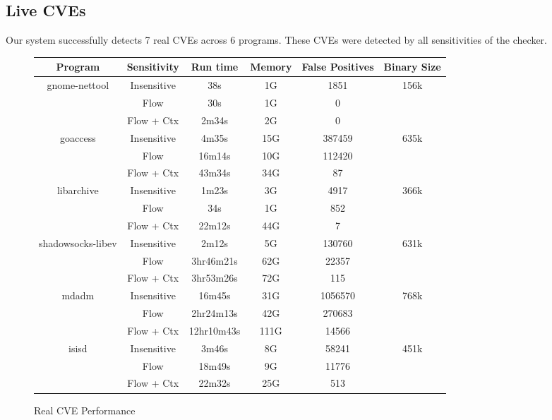 \subsection{Live CVEs}
Our system successfully detects 7 real CVEs across 6 programs.
These CVEs were detected by all sensitivities of the checker.

\begin{figure*}
\begin{center}
\begin{tabular}{|c|c||c|c|c|c|}
\hline
Program & Sensitivity & Run time & Memory & False Positives & Binary Size\\
\hline \hline
\multirow{3}{*}{gnome-nettool} & Insensitive & 38s & 1G & 1851 & \multirow{3}{*}{156k}\\
	& Flow & 30s & 1G & 0 &\\
	& Flow + Ctx & 2m34s & 2G & 0 &\\
	\hline
\multirow{3}{*}{goaccess} & Insensitive & 4m35s & 15G & 387459 & \multirow{3}{*}{635k}\\
	& Flow & 16m14s & 10G & 112420 &\\
	& Flow + Ctx & 43m34s & 34G & 87 &\\
	\hline
\multirow{3}{*}{libarchive} & Insensitive & 1m23s & 3G & 4917 & \multirow{3}{*}{366k}\\
	& Flow & 34s & 1G & 852 &\\
	& Flow + Ctx & 22m12s & 44G & 7 &\\
	\hline
\multirow{3}{*}{shadowsocks-libev} & Insensitive & 2m12s & 5G & 130760 & \multirow{3}{*}{631k}\\
	& Flow & 3hr46m21s & 62G & 22357 &\\
	& Flow + Ctx & 3hr53m26s & 72G & 115 &\\
	\hline
\multirow{3}{*}{mdadm} & Insensitive & 16m45s & 31G & 1056570 & \multirow{3}{*}{768k}\\
	& Flow & 2hr24m13s & 42G & 270683 &\\
	& Flow + Ctx & 12hr10m43s & 111G & 14566 &\\
	\hline
\multirow{3}{*}{isisd} & Insensitive & 3m46s & 8G & 58241 & \multirow{3}{*}{451k}\\
	& Flow & 18m49s & 9G & 11776 &\\
	& Flow + Ctx & 22m32s & 25G & 513 &\\
	\hline
\end{tabular}
\end{center}
\caption{Real CVE Performance}
\label{fig:cveperf}
\end{figure*}

